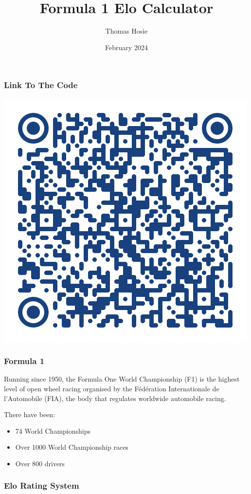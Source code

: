 \documentclass{beamer}
\title{Formula 1 Elo Calculator}
\author{Thomas Hosie}
\date{February 2024}
\begin{document}
\begin{frame}
    \titlepage
\end{frame}

\begin{frame}
    
    \frametitle{Link To The Code}
    \center\includegraphics[width=\textheight]{Qr Code.png}
\end{frame}

\begin{frame}
    \frametitle{Formula 1}
    Running since 1950, the Formula One World Championship (F1) is the highest 
    level of open wheel racing organised by the Fédération Internationale de 
    l'Automobile (FIA), the body that regulates worldwide automobile racing.\par
    There have been:
    \begin{itemize}
        \item 74 World Championships
        \item Over 1000 World Championship races
        \item Over 800 drivers
    \end{itemize}
\end{frame}

\begin{frame}
    \frametitle{Elo Rating System}
    
\end{frame}
\end{document}

